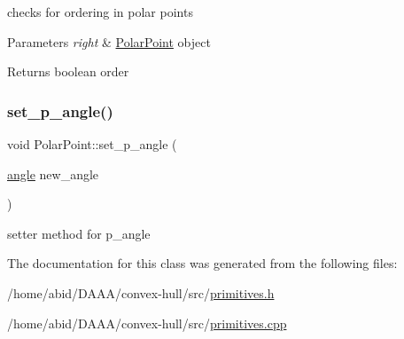 checks for ordering in polar points 
\begin{DoxyParams}{Parameters}
{\em right} & \mbox{\hyperlink{class_polar_point}{Polar\+Point}} object \\
\hline
\end{DoxyParams}
\begin{DoxyReturn}{Returns}
boolean order 
\end{DoxyReturn}
\mbox{\label{class_polar_point_ac63f2017507c73c4bd3c5f89994627ef}} 
\subsubsection{\texorpdfstring{set\_p\_angle()}{set\_p\_angle()}}
{\footnotesize\ttfamily void Polar\+Point\+::set\+\_\+p\+\_\+angle (\begin{DoxyParamCaption}\item[{\mbox{\hyperlink{primitives_8h_a41ee332ff1a31807cb838b616c186dd7}{angle}}}]{new\+\_\+angle }\end{DoxyParamCaption})}

setter method for p\+\_\+angle 

The documentation for this class was generated from the following files\+:\begin{DoxyCompactItemize}
\item 
/home/abid/\+D\+A\+A\+A/convex-\/hull/src/\mbox{\hyperlink{primitives_8h}{primitives.\+h}}\item 
/home/abid/\+D\+A\+A\+A/convex-\/hull/src/\mbox{\hyperlink{primitives_8cpp}{primitives.\+cpp}}\end{DoxyCompactItemize}
